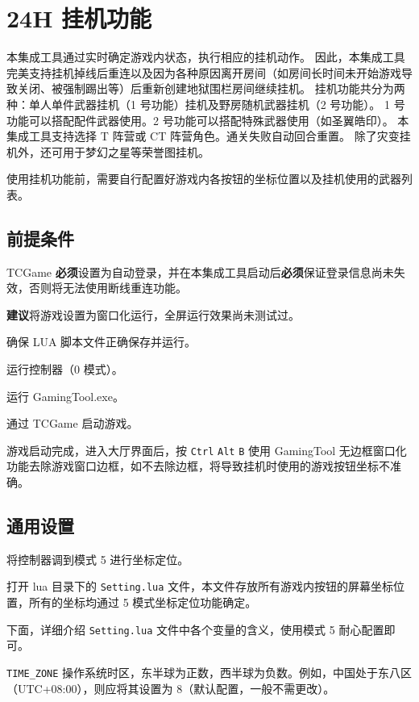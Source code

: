 \section{24H 挂机功能}

本集成工具通过实时确定游戏内状态，执行相应的挂机动作。
因此，本集成工具完美支持挂机掉线后重连以及因为各种原因离开房间（如房间长时间未开始游戏导致关闭、被强制踢出等）后重新创建地狱围栏房间继续挂机。
挂机功能共分为两种：单人单件武器挂机（1 号功能）挂机及野房随机武器挂机（2 号功能）。
1 号功能可以搭配配件武器使用。2 号功能可以搭配特殊武器使用（如圣翼皓印）。
本集成工具支持选择 T 阵营或 CT 阵营角色。通关失败自动回合重置。
除了灾变挂机外，还可用于梦幻之星等荣誉图挂机。

使用挂机功能前，需要自行配置好游戏内各按钮的坐标位置以及挂机使用的武器列表。

\subsection{前提条件}

TCGame \textbf{\color{red}必须}设置为自动登录，并在本集成工具启动后\textbf{\color{red}必须}保证登录信息尚未失效，否则将无法使用断线重连功能。

\textbf{\color{red}建议}将游戏设置为窗口化运行，全屏运行效果尚未测试过。

确保 LUA 脚本文件正确保存并运行。

运行控制器（0 模式）。

运行 GamingTool.exe。

通过 TCGame 启动游戏。

游戏启动完成，进入大厅界面后，按 \lstinline{Ctrl} \lstinline{Alt} \lstinline{B} 使用 GamingTool 无边框窗口化功能去除游戏窗口边框，如不去除边框，将导致挂机时使用的游戏按钮坐标不准确。

\subsection{通用设置}

将控制器调到模式 5 进行坐标定位。

打开 lua 目录下的 \lstinline{Setting.lua} 文件，本文件存放所有游戏内按钮的屏幕坐标位置，所有的坐标均通过 5 模式坐标定位功能确定。

下面，详细介绍 \lstinline{Setting.lua} 文件中各个变量的含义，使用模式 5 耐心配置即可。

\lstinline{TIME_ZONE} 操作系统时区，东半球为正数，西半球为负数。例如，中国处于东八区（UTC+08:00），则应将其设置为 8（默认配置，一般不需更改）。


